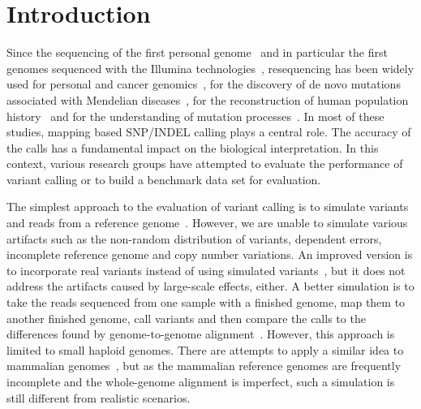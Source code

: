 \documentclass{bioinfo}
\begin{document}
\section{Introduction}

Since the sequencing of the first personal genome~\citep{Levy:2007uq} and in
particular the first genomes sequenced with the Illumina
technologies~\citep{Bentley:2008cr,Wang:2008nx}, resequencing has been widely
used for personal and cancer genomics~\citep{Watson:2013aa}, for the discovery
of de novo mutations associated with Mendelian diseases~\citep{Bamshad:2011aa},
for the reconstruction of human population history~\citep{Li:2011ij} and for
the understanding of mutation processes~\citep{Veltman:2012aa,Campbell:2013aa}.
In most of these studies, mapping based SNP/INDEL calling plays a central role.
The accuracy of the calls has a fundamental impact on the biological
interpretation. In this context, various research groups have attempted to
evaluate the performance of variant calling or to build a benchmark data set
for evaluation.

The simplest approach to the evaluation of variant calling is to simulate
variants and reads from a reference genome~\citep{Li:2008zr}. However, we are
unable to simulate various artifacts such as the non-random distribution of
variants, dependent errors, incomplete reference genome and copy number
variations. An improved version is to incorporate real variants instead of
using simulated variants~\citep{Talwalkar:2013aa}, but it does not address the
artifacts caused by large-scale effects, either. A better simulation is to take
the reads sequenced from one sample with a finished genome, map them to another
finished genome, call variants and then compare the calls to the differences found by genome-to-genome
alignment~\citep{Li:2008zr}. However, this approach is limited to small haploid
genomes. There are attempts to apply a similar idea to mammalian
genomes~\citep{Li:2013ab,Bolosky:2014aa}, but as the mammalian reference
genomes are frequently incomplete and the whole-genome alignment is imperfect,
such a simulation is still different from realistic scenarios.
\end{document}
